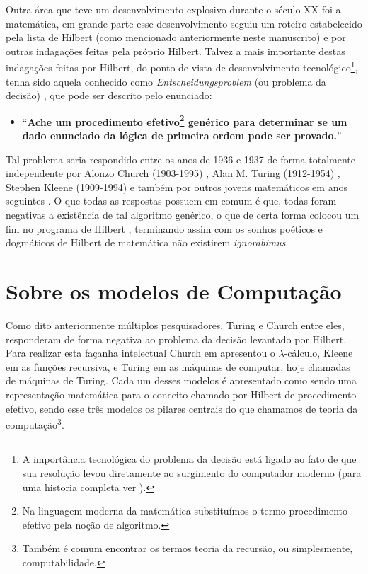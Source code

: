 Outra área que teve um desenvolvimento explosivo durante o século XX foi a matemática, em grande parte esse desenvolvimento seguiu um roteiro estabelecido pela lista de Hilbert (como mencionado anteriormente neste manuscrito) e por outras indagações feitas pela próprio Hilbert. Talvez a mais importante destas indagações feitas por Hilbert, do ponto de vista de desenvolvimento tecnológico\footnote{A importância tecnológica do problema da decisão está ligado ao fato de que sua resolução levou diretamente ao surgimento do computador moderno (para uma historia completa ver \cite{fonseca2007}).}, tenha sido aquela conhecido como \textit{Entscheidungsproblem} (ou problema da decisão) \cite{fonseca2007}, que pode ser descrito pelo enunciado:
\begin{itemize}
	\item[ ] ``\textbf{Ache um procedimento efetivo\footnote{Na linguagem moderna da matemática substituímos o termo procedimento efetivo pela noção de algoritmo.} genérico para determinar se um dado enunciado da lógica de primeira ordem pode ser provado.}''
\end{itemize}
Tal problema seria respondido entre os anos de 1936 e 1937 de forma totalmente independente por Alonzo Church (1903-1995) \cite{church1936b, church1936}, Alan M. Turing (1912-1954) \cite{britton1992, herken1992, turing1937}, Stephen Kleene (1909-1994) \cite{kleene1936} e também por outros jovens matemáticos em anos seguintes \cite{coelho2010, shepherdson1963}. O que todas as respostas possuem em comum é que, todas foram negativas a existência de tal algoritmo genérico, o que de certa forma colocou um fim no programa de Hilbert \cite{abramsky1992, ullman1992, sernadas2006}, terminando assim com os sonhos poéticos e dogmáticos de Hilbert \cite{fonseca2007} de matemática não existirem \textit{ignorabimus}.

\section{Sobre os modelos de Computação}\label{sec:ModeloDeComputacao}

Como dito anteriormente múltiplos pesquisadores, Turing e Church entre eles, responderam de forma negativa ao problema da decisão levantado por Hilbert. Para realizar esta façanha intelectual Church em \cite{church1936} apresentou o $\lambda$-cálculo, Kleene em \cite{kleene1936} as funções recursiva, e Turing em \cite{turing1937} as máquinas de computar, hoje chamadas de máquinas de Turing. Cada um desses modelos é apresentado como sendo uma representação matemática para o conceito chamado por Hilbert de procedimento efetivo, sendo esse três modelos os pilares centrais do que chamamos de teoria da computação\footnote{Também é comum encontrar os termos teoria da recursão, ou simplesmente, computabilidade.}. 

